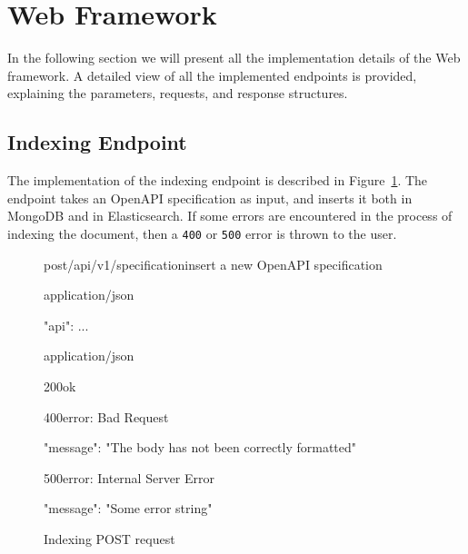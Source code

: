 \section{Web Framework}\label{sec:web-framework}
In the following section we will present all the implementation details of the Web framework.
A detailed view of all the implemented endpoints is provided, explaining the parameters, requests, and response structures.

\subsection{Indexing Endpoint}\label{subsec:indexing-endpoint}
The implementation of the indexing endpoint is described in Figure~\ref{fig:indexing-request}.
The endpoint takes an OpenAPI specification as input, and inserts it both in MongoDB and in Elasticsearch.
If some errors are encountered in the process of indexing the document, then a \verb|400| or \verb|500| error is thrown to the user.

\begin{figure}[!h]
    \begin{apiRoute}{post}{/api/v1/specification}{insert a new OpenAPI specification}
        \begin{routeParameter}
        \end{routeParameter}

        \begin{routeRequest}{application/json}
            \begin{routeRequestBody}
{
    "api": {
        ...
    }
}
            \end{routeRequestBody}
        \end{routeRequest}

        \begin{routeResponse}{application/json}
            \begin{routeResponseItem}{200}{ok}
            \end{routeResponseItem}

            \begin{routeResponseItem}{400}{error: Bad Request}
                \begin{routeResponseItemBody}
{
    "message": "The body has not been correctly formatted"
}
                \end{routeResponseItemBody}
            \end{routeResponseItem}

            \begin{routeResponseItem}{500}{error: Internal Server Error}
                \begin{routeResponseItemBody}
{
    "message": "Some error string"
}
                \end{routeResponseItemBody}
            \end{routeResponseItem}
        \end{routeResponse}
    \end{apiRoute}

    \caption{Indexing POST request}
    \label{fig:indexing-request}
\end{figure}

